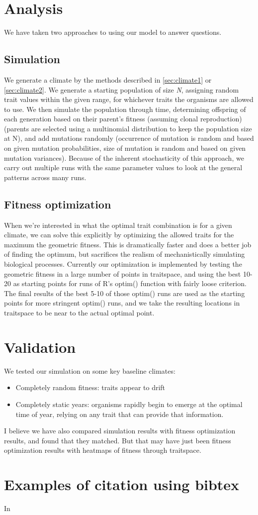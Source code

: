 \documentclass[11pt,a4paper]{article}
\begin{document}
\section{Analysis}
We have taken two approaches to using our model to answer questions.

\subsection{Simulation}
We generate a climate by the methods described in \ref{sec:climate1} or \ref{sec:climate2}. We generate a starting population of size \textit{N}, assigning random trait values within the given range, for whichever traits the organisms are allowed to use. We then simulate the population through time, determining offspring of each generation based on their parent's fitness (assuming clonal reproduction) (parents are selected using a multinomial distribution to keep the population size at N), and add mutations randomly (occurrence of mutation is random and based on given mutation probabilities, size of mutation is random and based on given mutation variances). Because of the inherent stochasticity of this approach, we carry out multiple runs with the same parameter values to look at the general patterns across many runs.
\subsection{Fitness optimization}
When we're interested in what the optimal trait combination is for a given climate, we can solve this explicitly by optimizing the allowed traits for the maximum the geometric fitness. This is dramatically faster and does a better job of finding the optimum, but sacrifices the realism of mechanistically simulating biological processes. Currently our optimization is implemented by testing the geometric fitness in a large number of points in traitspace, and using the best 10-20 as starting points for runs of R's optim() function with fairly loose criterion. The final results of the best 5-10 of those optim() runs are used as the starting points for more stringent optim() runs, and we take the resulting locations in traitspace to be near to the actual optimal point. 

\section{Validation}
We tested our simulation on some key baseline climates:
\begin{itemize}
  \item Completely random fitness: traits appear to drift
  \item Completely static years: organisms rapidly begin to emerge at the optimal time of year, relying on any trait that can provide that information.
\end{itemize}
I believe we have also compared simulation results with fitness optimization results, and found that they matched. But that may have just been fitness optimization results with heatmaps of fitness through traitspace.

\clearpage

\section{Examples of citation using bibtex}
In 
\end{document}
